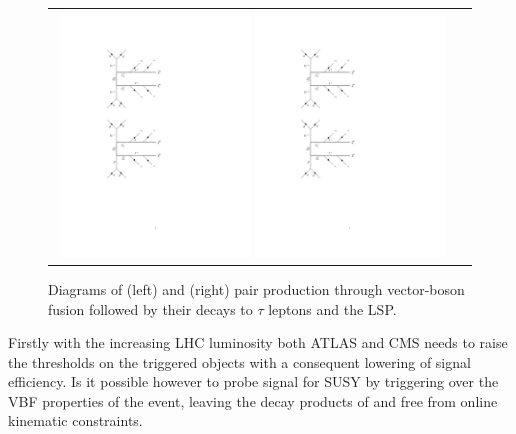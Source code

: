 \begin{figure}[tbh!]
	\centering
	\begin{tabular}{cc}
		\includegraphics[width=0.48\textwidth]{diagrams/pics/signal_C1N2.pdf}
		\includegraphics[width=0.48\textwidth]{diagrams/pics/signal_C1C1.pdf} 		
	\end{tabular}
	\caption{Diagrams of (left) \charginopm \neutralinotwo and (right) \charginopm \charginomp pair production through vector-boson fusion followed by their decays to $\tau$ leptons and the LSP.}
	\label{fig:VBF_diagrams}
\end{figure}

Firstly with the increasing LHC luminosity both ATLAS and CMS needs to raise the \pt thresholds on the triggered objects with a consequent lowering of signal efficiency.  Is it possible however to probe signal for SUSY by triggering over the VBF properties of the event, leaving the decay products of \charginopm and \neutralinotwo free from online kinematic constraints.

